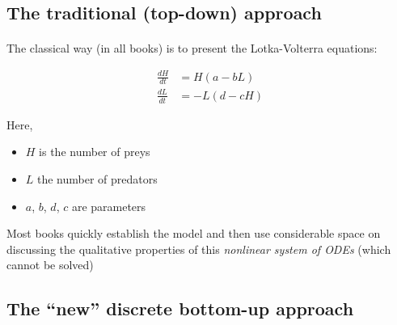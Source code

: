 \documentclass[%
twoside,                 %
final,                   %
10pt]{article}
\begin{document}
\noindent




\subsection{The traditional (top-down) approach}


\paragraph{}
The classical way (in all books) is to present the Lotka-Volterra equations:

\begin{align*}
\frac{dH}{dt} &= H(a - b L)\\ 
\frac{dL}{dt} &= - L(d - c  H)
\end{align*}

Here,

\begin{itemize}
 \item $H$ is the number of preys

 \item $L$ the number of predators

 \item $a$, $b$, $d$, $c$ are parameters
\end{itemize}

\noindent
Most books quickly establish the model and then use considerable space on
discussing the qualitative properties of this \emph{nonlinear system of
ODEs} (which cannot be solved)




\subsection{The ``new'' discrete bottom-up approach}


\end{document}
